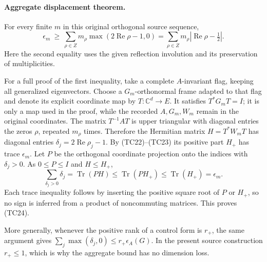 \paragraph{Aggregate displacement theorem.}
For every finite \(m\) in this original orthogonal source sequence,
\[
 \boxed{\epsilon_m\ \geq\
   \sum_{\rho\in Z}m_\rho\max(2\operatorname{Re}\rho-1,0)
   =\sum_{\rho\in Z}m_\rho
                    |\operatorname{Re}\rho-\tfrac12|.}
 \tag{TC24}
\]
Here the second equality uses the given reflection involution and
its preservation of multiplicities.

For a full proof of the first inequality, take a complete
\(A\)-invariant flag, keeping all generalized eigenvectors.
Choose a \(G_m\)-orthonormal frame adapted to that flag and denote
its explicit coordinate map by \(T:\mathbb C^d\to E\).
It satisfies \(T^*G_mT=I\); it is only a map used in the proof, while
the recorded \(A,G_m,W_m\) remain in the original coordinates.
The matrix \(T^{-1}AT\) is upper triangular with diagonal entries
the zeros \(\rho\), repeated \(m_\rho\) times.  Therefore the
Hermitian matrix \(H=T^*W_mT\) has diagonal entries
\(\delta_j=2\operatorname{Re}\rho_j-1\).
By (TC22)--(TC23) its positive part \(H_+\) has trace
\(\epsilon_m\).
Let \(P\) be the orthogonal coordinate projection onto the indices
with \(\delta_j>0\).  As \(0\leq P\leq I\) and \(H\leq H_+\),
\[
 \sum_{\delta_j>0}\delta_j
       =\operatorname{Tr}(PH)
       \leq\operatorname{Tr}(PH_+)
       \leq\operatorname{Tr}(H_+)=\epsilon_m.
 \tag{TC25}
\]
Each trace inequality follows by inserting the positive square root
of \(P\) or \(H_+\), so no sign is inferred from a product of
noncommuting matrices.  This proves (TC24).

More generally, whenever the positive rank of a control form is
\(r_+\), the same argument gives
\(\sum_j\max(\delta_j,0)\leq r_+\epsilon_A(G)\).
In the present source construction \(r_+\leq1\), which is why the
aggregate bound has no dimension loss.

